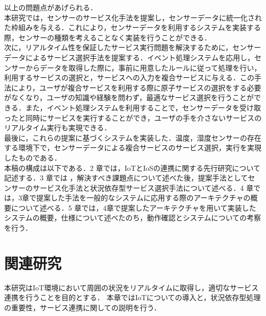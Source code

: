 \documentclass{kuisthesis}			%
\begin{document}
以上の問題点があげられる．\\
本研究では，センサーのサービス化手法を提案し，センサーデータに統一化された枠組みを与える．これにより，センサーデータを利用するシステムを実装する際，センサーの種類を考えることなく実装を行うことができる．\\
次に，リアルタイム性を保証したサービス実行問題を解決するために，センサーデータによるサービス選択手法を提案する．イベント処理システムを応用し，センサーからデータを取得した際に，事前に用意したルールに従って処理を行い，利用するサービスの選択と，サービスへの入力を複合サービスに与える．この手法により，ユーザが複合サービスを利用する際に原子サービスの選択をする必要がなくなり，ユーザの知識や経験を問わず，最適なサービス選択を行うことができる．また，イベント処理システムを利用することで，センサーデータを受け取ったと同時にサービスを実行することができ，ユーザの手を介さないサービスのリアルタイム実行も実現できる．\\
最後に，これらの提案に基づくシステムを実装した．温度，湿度センサーの存在する環境下で，センサーデータによる複合サービスのサービス選択，実行を実現したものである．\\
本稿の構成は以下である．2 章では，IoTとIoSの連携に関する先行研究について記述する．3 章では ，解決すべき課題点について述べた後，提案手法としてセンサーのサービス化手法と状況依存型サービス選択手法について述べる．4 章では，3章で提案した手法を一般的なシステムに応用する際のアーキテクチャの概要について述べる．5 章では，4章で提案したアーキテクチャを用いて実装したシステムの概要，仕様について述べたのち，動作確認とシステムについての考察を行う．

\section{関連研究}\label{sec-structure}
本研究はIoT環境において周囲の状況をリアルタイムに取得し，適切なサービス連携を行うことを目的とする．
本章ではIoTについての導入と，状況依存型処理の重要性，サービス連携に関しての説明を行う．
\end{document}
